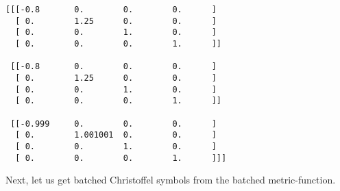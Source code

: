 \documentclass[11pt]{article}
\begin{document}
    \begin{Verbatim}[commandchars=\\\{\}]
[[[-0.8       0.        0.        0.      ]
  [ 0.        1.25      0.        0.      ]
  [ 0.        0.        1.        0.      ]
  [ 0.        0.        0.        1.      ]]

 [[-0.8       0.        0.        0.      ]
  [ 0.        1.25      0.        0.      ]
  [ 0.        0.        1.        0.      ]
  [ 0.        0.        0.        1.      ]]

 [[-0.999     0.        0.        0.      ]
  [ 0.        1.001001  0.        0.      ]
  [ 0.        0.        1.        0.      ]
  [ 0.        0.        0.        1.      ]]]
    \end{Verbatim}

    Next, let us get batched Christoffel symbols from the batched
metric-function.
\end{document}
